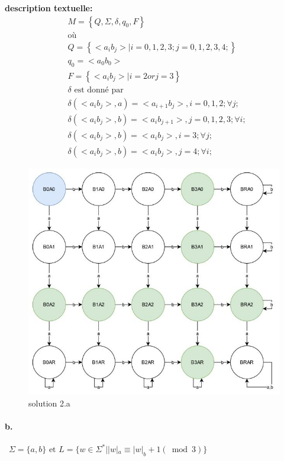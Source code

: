 \documentclass{article}
\newcommand{\ac}[1]{\left\{ #1 \right\}}
\begin{document}
\textbf{description textuelle:}
\begin{align}
     &M = \ac{Q,\Sigma, \delta, q_0, F}\nonumber\\
     &\text{où}\nonumber\\
     & Q = \ac{<a_ib_j> | i = 0,1,2,3; j = 0,1,2,3,4;}\nonumber\\
     &  q_0 = <a_0b_0>\nonumber\\
     &   F = \ac{<a_ib_j> | i = 2 or j = 3}\nonumber\\
     &   \delta \text{ est donné par}\nonumber\\
     &   \delta (<a_ib_j>,a) =<a_{i+1}b_j>, i = 0,1,2; \forall j; \nonumber\\
     &   \delta (<a_ib_j>,b) =<a_{i}b_{j+1}>, j = 0,1,2,3; \forall i; \nonumber\\
     &   \delta (<a_ib_j>,b) =<a_{i}b_{j}>, i = 3; \forall j; \nonumber\\
     &   \delta (<a_ib_j>,b) =<a_{i}b_{j}>, j = 4; \forall i;\nonumber 
\end{align}
   
        
\begin{figure}[h]
    \centering
    \includegraphics[scale = 0.45]{2a.jpg}
    \caption{solution 2.a}
    \label{fig.2a}
\end{figure}
\newpage

\paragraph{b.}~$\Sigma = \{a,b\} \text{ et } L = \{w \in \Sigma^{*} | |w|_{a } \equiv |w|_{b} +1 (\bmod 3)\}$ \\ 
\end{document}
